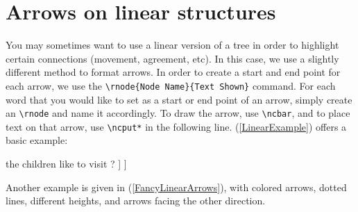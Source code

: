 \documentclass{article}
\begin{document}
\vspace{-5em} %

\section{Arrows on linear structures}

You may sometimes want to use a linear version of a tree in order to highlight certain connections (movement, agreement, etc). In this case, we use a slightly different method to format arrows. In order to create a start and end point for each arrow, we use the \verb|\rnode{Node Name}{Text Shown}| command. For each word that you would like to set as a start or end point of an arrow, simply create an \verb|\rnode| and name it accordingly. To draw the arrow, use \verb|\ncbar|, and to place text on that arrow, use \verb|\ncput*| in the following line. (\ref{LinearExample}) offers a basic example: 

\vspace{2em} %

\ea \label{LinearExample}

    the children  like to visit  ? ] ] %
\z

\vspace{2em} %

\noindent Another example is given in (\ref{FancyLinearArrows}), with colored arrows, dotted lines, different heights, and arrows facing the other direction. 
\end{document}
